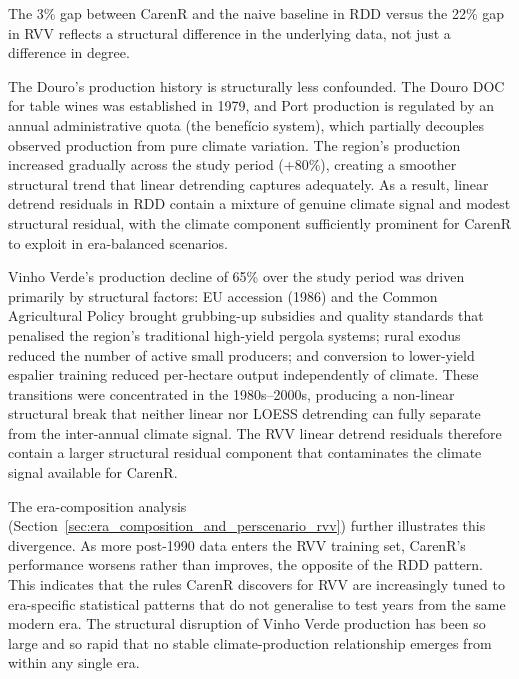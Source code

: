 The 3\% gap between CarenR and the naive baseline in RDD versus the 22\% gap in RVV reflects a structural difference in the underlying data, not just a difference in degree.

The Douro's production history is structurally less confounded. The Douro DOC for table wines was established in 1979, and Port production is regulated by an annual administrative quota (the benefício system), which partially decouples observed production from pure climate variation. The region's production increased gradually across the study period (+80\%), creating a smoother structural trend that linear detrending captures adequately. As a result, linear detrend residuals in RDD contain a mixture of genuine climate signal and modest structural residual, with the climate component sufficiently prominent for CarenR to exploit in era-balanced scenarios.

Vinho Verde's production decline of 65\% over the study period was driven primarily by structural factors: EU accession (1986) and the Common Agricultural Policy brought grubbing-up subsidies and quality standards that penalised the region's traditional high-yield pergola systems; rural exodus reduced the number of active small producers; and conversion to lower-yield espalier training reduced per-hectare output independently of climate. These transitions were concentrated in the 1980s--2000s, producing a non-linear structural break that neither linear nor LOESS detrending can fully separate from the inter-annual climate signal. The RVV linear detrend residuals therefore contain a larger structural residual component that contaminates the climate signal available for CarenR.

The era-composition analysis (Section~\ref{sec:era_composition_and_perscenario_rvv}) further illustrates this divergence. As more post-1990 data enters the RVV training set, CarenR's performance worsens rather than improves, the opposite of the RDD pattern. This indicates that the rules CarenR discovers for RVV are increasingly tuned to era-specific statistical patterns that do not generalise to test years from the same modern era. The structural disruption of Vinho Verde production has been so large and so rapid that no stable climate-production relationship emerges from within any single era.

